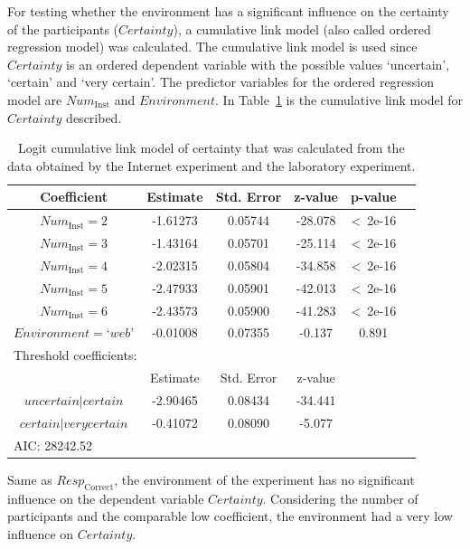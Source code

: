 For testing whether the environment has a significant influence on the certainty of the participants ($\textit{Certainty}$), a cumulative link model (also called ordered regression model) was calculated\cite{Christensen2012}. The cumulative link model is used since $\textit{Certainty}$ is an ordered dependent variable with the possible values `uncertain', `certain' and `very certain'. The predictor variables for the ordered regression model are $\textit{Num}_{\mathrm{Inst}}$ and $\textit{Environment}$. In Table~\ref{table:olr_both} is the cumulative link model for $\textit{Certainty}$ described.
\begin{table}[t]
\center
\scriptsize
\begin{tabular*}{0.45\textwidth}{cccccc}
\toprule[1.5pt]
Coefficient & Estimate & Std. Error & z-value & p-value\\
\midrule
$\textit{Num}_{\mathrm{Inst}} = 2$ & -1.61273 & 0.05744 & -28.078  & \textless~2e-16\\
$\textit{Num}_{\mathrm{Inst}} = 3$ & -1.43164 & 0.05701 & -25.114  & \textless~2e-16\\
$\textit{Num}_{\mathrm{Inst}} = 4$ & -2.02315 & 0.05804 & -34.858  & \textless~2e-16\\
$\textit{Num}_{\mathrm{Inst}} = 5$ & -2.47933 & 0.05901 & -42.013  & \textless~2e-16\\
$\textit{Num}_{\mathrm{Inst}} = 6$ & -2.43573 & 0.05900 & -41.283  & \textless~2e-16\\
$\textit{Environment} = \textrm{`}web\textrm{'}$ & -0.01008 & 0.07355 & -0.137  & 0.891\\
\midrule
\multicolumn{5}{l}{Threshold coefficients:}\\
& Estimate & Std. Error & z-value &\\
$uncertain|certain$ & -2.90465 & 0.08434 & -34.441  &\\
$certain|very certain$ & -0.41072 & 0.08090 & -5.077  &\\
\multicolumn{5}{l}{AIC: 28242.52}\\
\bottomrule[1.5pt]
\end{tabular*}
\caption{Logit cumulative link model of certainty that was calculated from the data obtained by the Internet experiment and the laboratory experiment.}
\label{table:olr_both}
\end{table}
Same as $\textit{Resp}_{\mathrm{Correct}}$, the environment of the experiment has no significant influence on the dependent variable $\textit{Certainty}$. Considering the number of participants and the comparable low coefficient, the environment had a very low influence on $\textit{Certainty}$.

